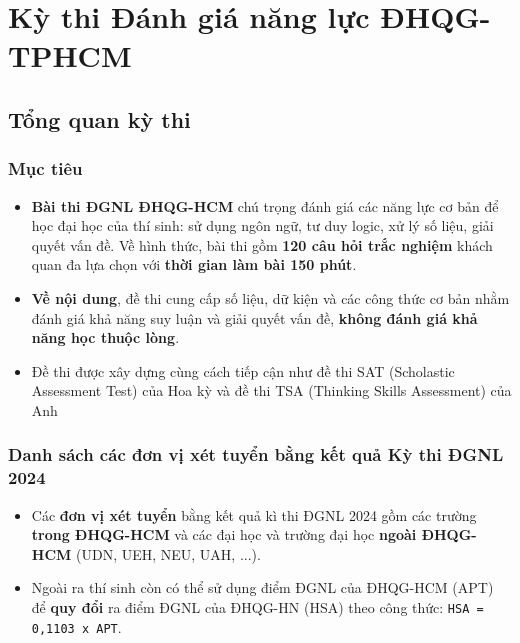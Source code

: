 \section{Kỳ thi Đánh giá năng lực ĐHQG-TPHCM}
\subsection{Tổng quan kỳ thi}
\subsubsection{Mục tiêu}
\begin{itemize}
    \item \textbf{Bài thi ĐGNL ĐHQG-HCM} chú trọng đánh giá các năng lực cơ bản để học đại học của thí sinh: sử dụng ngôn ngữ, tư duy logic, xử lý số liệu, giải quyết vấn đề. Về hình thức, bài thi gồm \textbf{120 câu hỏi trắc nghiệm} khách quan đa lựa chọn với \textbf{thời gian làm bài 150 phút}.
    \item \textbf{Về nội dung}, đề thi cung cấp số liệu, dữ kiện và các công thức cơ bản nhằm đánh giá khả năng suy luận và giải quyết vấn đề, \textbf{không đánh giá khả năng học thuộc lòng}. 
    \item Đề thi được xây dựng cùng cách tiếp cận như đề thi SAT (Scholastic Assessment Test) của Hoa kỳ và đề thi TSA (Thinking Skills Assessment) của Anh
\end{itemize}

\subsubsection{Danh sách các đơn vị xét tuyển bằng kết quả Kỳ thi ĐGNL 2024}
\begin{itemize}
    \item Các \textbf{đơn vị xét tuyển} bằng kết quả kì thi ĐGNL 2024 gồm các trường \textbf{trong ĐHQG-HCM} và các đại học và trường đại học \textbf{ngoài ĐHQG-HCM} (UDN, UEH, NEU, UAH, ...). \cite{dvxettuyen}
    \item Ngoài ra thí sinh còn có thể sử dụng điểm ĐGNL của ĐHQG-HCM (APT) để \textbf{quy đổi} ra điểm ĐGNL của ĐHQG-HN (HSA) theo công thức: \texttt{HSA = 0,1103 x APT}. \cite{apt_to_hsa} 
\end{itemize}
 
